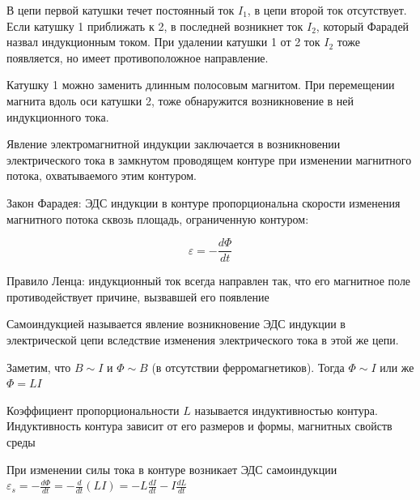 В цепи первой катушки течет постоянный ток $I_1$, в цепи второй ток отсутствует. 
Если катушку 1 приближать к 2, в последней возникнет ток $I_2$, который Фарадей назвал индукционным током. 
При удалении катушки 1 от 2 ток $I_2$ тоже появляется, но имеет противоположное направление.

Катушку 1 можно заменить длинным полосовым магнитом. При перемещении магнита вдоль оси катушки 2, тоже обнаружится возникновение в ней 
индукционного тока.

Явление электромагнитной индукции заключается в возникновении электрического тока в замкнутом проводящем
контуре при изменении магнитного потока, охватываемого этим контуром. 

\begin{MyTheorem}
    Закон Фарадея: ЭДС индукции в контуре пропорциональна скорости изменения магнитного потока сквозь площадь, 
    ограниченную контуром:

    \[\varepsilon = - \frac{d\Phi}{dt}\]
\end{MyTheorem}

\begin{MyTheorem}
    Правило Ленца: индукционный ток всегда направлен так, что его магнитное поле противодействует причине, вызвавшей его появление
\end{MyTheorem}

Самоиндукцией называется явление возникновение ЭДС индукции в электрической цепи вследствие
изменения электрического тока в этой же цепи.

Заметим, что $B \sim I$ и $\Phi \sim B$ (в отсутствии ферромагнетиков). Тогда $\Phi \sim I$ или же $\Phi = LI$

Коэффициент пропорциональности $L$ называется индуктивностью контура. Индуктивность контура зависит от его размеров
и формы, магнитных свойств среды

При изменении силы тока в контуре возникает ЭДС самоиндукции $\varepsilon_s = -\frac{d\Phi}{dt} = -\frac{d}{dt}(LI) = -L\frac{dI}{dt} - I\frac{dL}{dt}$

\clearpage
